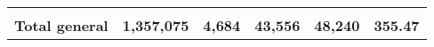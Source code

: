 \begin{tabular}{lrcclr}
	& \multicolumn{1}{l}{}                                           & \multicolumn{1}{l}{}                                       & \multicolumn{1}{l}{} &                                                                     & \multicolumn{1}{l}{}                                                         \\
	\rowcolor[HTML]{DDEBF7} 
	\textbf{Total   general}                                       & \textbf{1,357,075}                                             & \multicolumn{1}{r}{\cellcolor[HTML]{DDEBF7}\textbf{4,684}} & \textbf{43,556}      & \textbf{48,240}                                                     & \textbf{355.47}                                                             
\end{tabular}